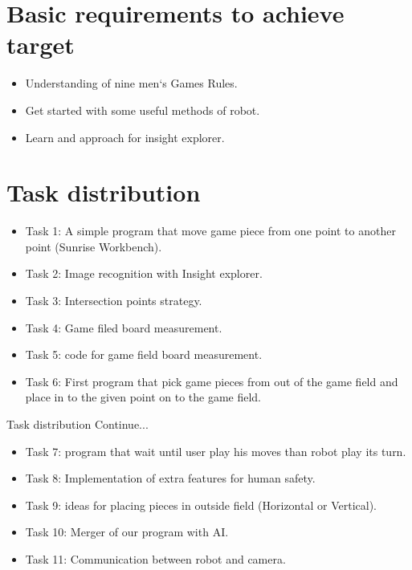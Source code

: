 \documentclass{beamer}
\begin{document}
\section{Basic requirements to achieve target}
\begin{frame}
\begin{itemize}
\item Understanding of nine men`s Games Rules.
\item Get started with some useful methods of robot.
\item Learn and approach for insight explorer. 
\end{itemize}
\end{frame}


\section{Task distribution}
\begin{frame}
\begin{itemize}
\item Task 1: A simple program that move game piece from one point to another point (Sunrise Workbench).
\item Task 2: Image recognition with Insight explorer.
\item Task 3: Intersection points strategy.
\item Task 4: Game filed board measurement.
\item Task 5: code for game field board measurement.
\item Task 6: First program that pick game pieces from out of the game field and place in to the given point on to the game field.

\end{itemize}
\end{frame}

\begin{frame}{Task distribution Continue...}
\begin{itemize}
\item Task 7: program that wait until user play his moves than robot play its turn.
\item Task 8: Implementation of extra features for human safety.
\item Task 9: ideas for placing pieces in outside field (Horizontal or Vertical).
\item Task 10: Merger of our program with AI.
\item Task 11: Communication between robot and camera.
\end{itemize}
\end{frame}
\end{document}
